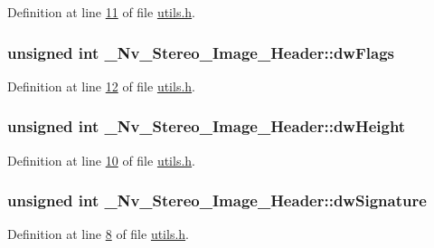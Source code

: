 Definition at line \hyperlink{utils_8h_source_l00011}{11} of file \hyperlink{utils_8h_source}{utils.h}.

\hypertarget{struct___nv___stereo___image___header_ad99da98f0c7e667408c3bba51ff5d047}{
\subsubsection[{dwFlags}]{\setlength{\rightskip}{0pt plus 5cm}unsigned int {\bf \_\-Nv\_\-Stereo\_\-Image\_\-Header::dwFlags}}}
\label{struct___nv___stereo___image___header_ad99da98f0c7e667408c3bba51ff5d047}


Definition at line \hyperlink{utils_8h_source_l00012}{12} of file \hyperlink{utils_8h_source}{utils.h}.

\hypertarget{struct___nv___stereo___image___header_a72c1451aca7cb9c87540b647d51b25ad}{
\subsubsection[{dwHeight}]{\setlength{\rightskip}{0pt plus 5cm}unsigned int {\bf \_\-Nv\_\-Stereo\_\-Image\_\-Header::dwHeight}}}
\label{struct___nv___stereo___image___header_a72c1451aca7cb9c87540b647d51b25ad}


Definition at line \hyperlink{utils_8h_source_l00010}{10} of file \hyperlink{utils_8h_source}{utils.h}.

\hypertarget{struct___nv___stereo___image___header_aac21b6be816ef3e6b98d1f1183263fd9}{
\subsubsection[{dwSignature}]{\setlength{\rightskip}{0pt plus 5cm}unsigned int {\bf \_\-Nv\_\-Stereo\_\-Image\_\-Header::dwSignature}}}
\label{struct___nv___stereo___image___header_aac21b6be816ef3e6b98d1f1183263fd9}


Definition at line \hyperlink{utils_8h_source_l00008}{8} of file \hyperlink{utils_8h_source}{utils.h}.

